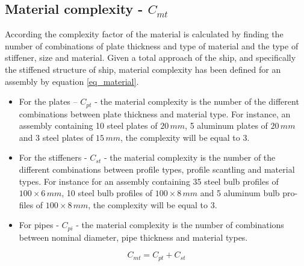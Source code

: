 \subsection{Material complexity - $C_{mt}$}
According \cite{Rigterink2013} the complexity factor of the material is calculated by finding the number of combinations of plate thickness and type of material and the type of stiffener, size and material. 
Given a total approach of the ship, and specifically  the stiffened structure of ship, material complexity has been defined for an assembly by equation \ref{eq_material}.


\begin{itemize}
\item For the plates -- $C_{pt}$ - the material complexity is the number of the different combinations between plate thickness and material type. For instance, an assembly containing 10 steel plates of $20 \, mm$, 5 aluminum plates of $20 \, mm$ and 3 steel plates of $15 \, mm$, the complexity will be equal to 3.
\item For the stiffeners - $C_{st}$ - the material complexity is the number of the different combinations between profile types, profile scantling and material types. For instance for an assembly containing 35 steel bulb profiles of $100 \times 6 \, mm$, 10 steel bulb profiles of $100 \times 8 \, mm$ and 5 aluminum bulb pro-files of $100 \times 8 \, mm$, the complexity will be equal to 3.
\item For pipes - $C_{pi}$ - the material complexity is the number of combinations between nominal diameter, pipe thickness and material types.
\end{itemize}


\begin{equation}
\label{eq_material}
C_{mt} = C_{pt}+C_{st}
\end{equation}


	
